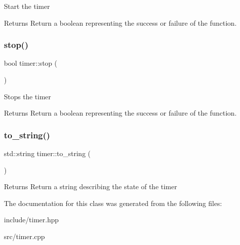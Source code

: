 Start the timer \begin{DoxyReturn}{Returns}
Return a boolean representing the success or failure of the function. 
\end{DoxyReturn}
\mbox{\label{classtimer_ad21a0c9113d870f8485b775f1fcd3c73}} 
\subsubsection{\texorpdfstring{stop()}{stop()}}
{\footnotesize\ttfamily bool timer\+::stop (\begin{DoxyParamCaption}{ }\end{DoxyParamCaption})}

Stops the timer \begin{DoxyReturn}{Returns}
Return a boolean representing the success or failure of the function. 
\end{DoxyReturn}
\mbox{\label{classtimer_a8c068c53de6269fc3ced75cf27bf4ea6}} 
\subsubsection{\texorpdfstring{to\+\_\+string()}{to\_string()}}
{\footnotesize\ttfamily std\+::string timer\+::to\+\_\+string (\begin{DoxyParamCaption}{ }\end{DoxyParamCaption})}

\begin{DoxyReturn}{Returns}
Return a string describing the state of the timer 
\end{DoxyReturn}


The documentation for this class was generated from the following files\+:\begin{DoxyCompactItemize}
\item 
include/timer.\+hpp\item 
src/timer.\+cpp\end{DoxyCompactItemize}
